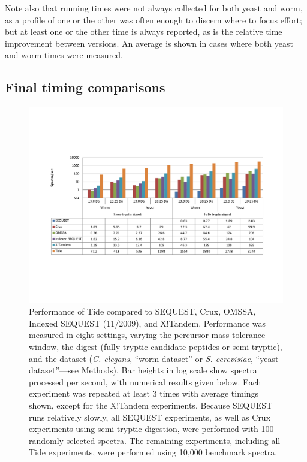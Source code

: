 Note also that running times were not always collected for both yeast
and worm, as a profile of one or the other was often enough to discern
where to focus effort; but at least one or the other time is always
reported, as is the relative time improvement between versions. An
average is shown in cases where both yeast and worm times were
measured.

\subsection{Final timing comparisons}

\begin{figure}
\centering
\includegraphics[width=6.5in]{timing_chart_main-cropped.pdf}
\caption[Performance of Tide compared to SEQUEST, Crux, OMSSA, Indexed SEQUEST,
  and X!Tandem]{Performance of Tide compared to SEQUEST, Crux, OMSSA, Indexed
  SEQUEST (11/2009), and X!Tandem. Performance was measured in eight settings,
  varying the percursor mass tolerance window, the digest (fully tryptic
  candidate peptides or semi-tryptic), and the dataset ({\it C. elegans}, ``worm
  dataset'' or {\it S. cerevisiae}, ``yeast dataset''---see Methods). Bar
  heights in log scale show spectra processed per second, with numerical results
  given below. Each experiment was repeated at least 3 times with average
  timings shown, except for the X!Tandem experiments. Because SEQUEST runs
  relatively slowly, all SEQUEST experiments, as well as Crux experiments using
  semi-tryptic digestion, were performed with 100 randomly-selected spectra. The
  remaining experiments, including all Tide experiments, were performed using
  10,000 benchmark spectra.
  \label{figure:perf-chart}}
\end{figure}


